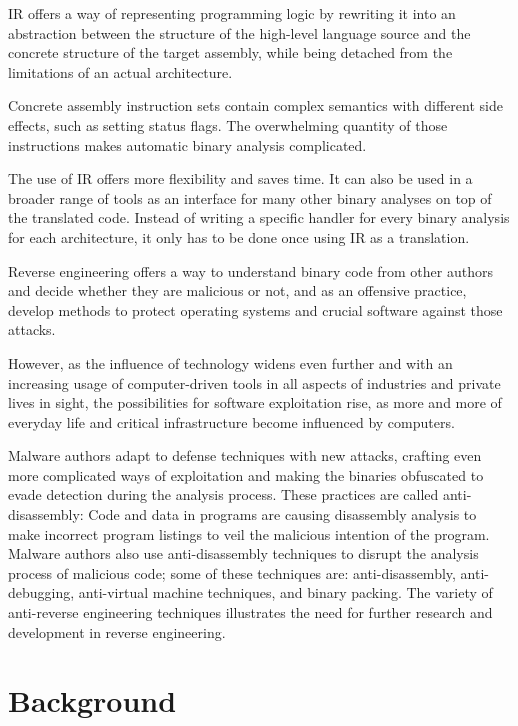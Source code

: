 \documentclass[seminar]{plai}
\begin{document}
IR offers a way of representing programming logic by rewriting it into an abstraction between the structure of the high-level language source and the concrete structure of the target assembly, while being detached from the limitations of an actual architecture.

Concrete assembly instruction sets contain complex semantics with different side effects, such as setting status flags.
The overwhelming quantity of those instructions makes automatic binary analysis complicated.

\noindent The use of IR offers more flexibility and saves time. It can also be used in a broader range of tools as an interface for many other binary analyses on top of the translated code. Instead of writing a specific handler for every binary analysis for each architecture, it only has to be done once using IR as a translation.

\noindent Reverse engineering offers a way to understand binary code from other authors and decide whether they are malicious or not, and as an offensive practice, develop methods to protect operating systems and crucial software against those attacks.

However, as the influence of technology widens even further and with an increasing usage of computer-driven tools in all aspects of industries and private lives in sight, the possibilities for software exploitation rise, as more and more of everyday life and critical infrastructure become influenced by computers.

Malware authors adapt to defense techniques with new attacks, crafting even more complicated ways of exploitation and making the binaries obfuscated to evade detection during the analysis process. These practices are called anti-disassembly: Code and data in programs are causing disassembly analysis to make incorrect program listings to veil the malicious intention of the program. Malware authors also use anti-disassembly techniques to disrupt the analysis process of malicious code; some of these techniques are: anti-disassembly, anti-debugging, anti-virtual machine techniques, and binary packing. \cite{practical-malware-analysis}
The variety of anti-reverse engineering techniques illustrates the need for further research and development in reverse engineering.

\section{Background}
\label{sec:background}
\end{document}
